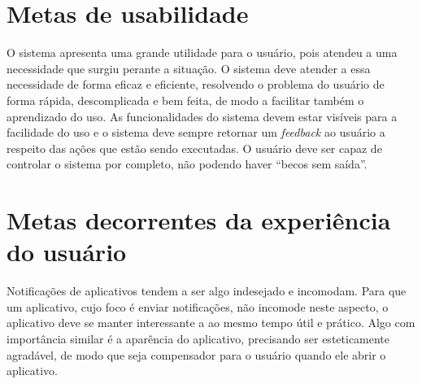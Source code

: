 \chapter{Metas de usabilidade}

O sistema apresenta uma grande utilidade para o usuário, pois atendeu a uma necessidade que surgiu perante a situação. 
O sistema deve atender a essa necessidade de forma eficaz e eficiente, resolvendo o problema do usuário de forma rápida,
descomplicada e bem feita, de modo a facilitar também o aprendizado do uso. As funcionalidades do sistema devem estar visíveis 
para a facilidade do uso e o sistema deve sempre retornar um \textit{feedback} ao usuário a respeito das ações que estão sendo executadas.
O usuário deve ser capaz de controlar o sistema por completo, não podendo haver “becos sem saída”.

\chapter{Metas decorrentes da experiência do usuário}

Notificações de aplicativos tendem a ser algo indesejado e incomodam. Para que um aplicativo, cujo foco é enviar notificações,
não incomode neste aspecto, o aplicativo deve se manter interessante a ao mesmo tempo útil e prático. Algo com importância similar
é a aparência do aplicativo, precisando ser esteticamente agradável, de modo que seja compensador para o usuário quando ele abrir 
o aplicativo. 